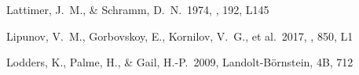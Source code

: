 \documentclass[twocolumn,twocolappendix]{aastex63}
\begin{document}
\begin{thebibliography}{}

















 Lattimer, J.~M., \& Schramm, D.~N.\ 1974, \apjl, 192, L145








 Lipunov, V.~M., Gorbovskoy, E., Kornilov, V.~G., et al.\ 2017, \apjl, 850, L1


 Lodders, K., Palme, H., \& Gail, H.-P.\ 2009, Landolt-B\"ornstein, 4B, 712


\end{thebibliography}
\end{document}
